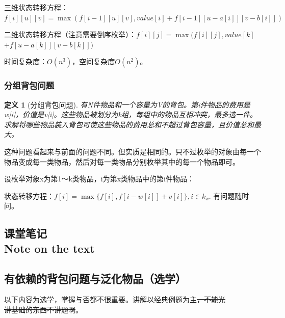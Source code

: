 \documentclass{article}
\newtheorem{definition}{定义}[subsection]
\theoremstyle{nonumberplain}
\newcommand{\note}{\ \par
	\subsection*{课堂笔记\\\tiny{Note on the text}}
	\newpage}
\begin{document}
三维状态转移方程：$f[i][u][v] = \max(f[i-1][u][v] , value[i] + f[i-1][u-a[i]][v-b[i]])$

二维状态转移方程（注意需要倒序枚举）：$f[i][j] = \max(f[i][j] , value[k]$ $+ f[u-a[k]][v-b[k]])$

时间复杂度：$O(n^3)$，空间复杂度$O(n^2)$。

\subsubsection{分组背包问题}
\begin{definition}[分组背包问题]有N件物品和一个容量为V的背包。第i件物品的费用是w[i]，价值是v[i]。这些物品被划分为k组，每组中的物品互相冲突，最多选一件。求解将哪些物品装入背包可使这些物品的费用总和不超过背包容量，且价值总和最大。\end{definition}

这种问题看起来与前面的问题不同。但实质是相同的。只不过枚举的对象由每一个物品变成每一类物品，然后对每一类物品分别枚举其中的每一个物品即可。

设枚举对象x为第1～k类物品，i为第x类物品中的第i件物品：

状态转移方程：$f[i]=\max\{f[i],f[i-w[i]]+v[i]\},i\in k_x.$
有问题随时问。
\note

\newpage
\subsection{有依赖的背包问题与泛化物品（选学）}
以下内容为选学，掌握与否都不很重要。讲解以经典例题为主\sout{，不能光\\讲基础的东西不讲题啊}。
\end{document}
